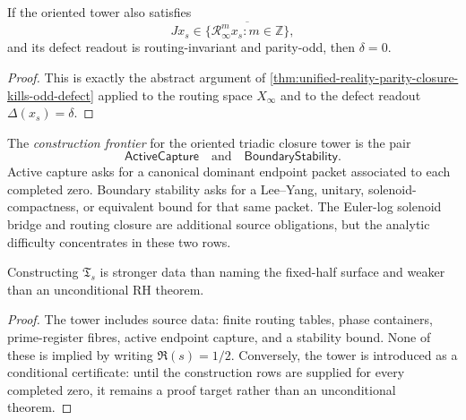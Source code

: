 \begin{corollary}
\label{cor:unified-reality-oriented-tower-parity-closure-same-conclusion}
If the oriented tower also satisfies
$$
Jx_s\in\overline{\{\mathcal R_\infty^m x_s:m\in\mathbb Z\}},
$$
and its defect readout is routing-invariant and parity-odd, then
$\delta=0$.
\end{corollary}

\begin{proof}
This is exactly the abstract argument of
\autoref{thm:unified-reality-parity-closure-kills-odd-defect} applied to
the routing space $X_\infty$ and to the defect readout
$\Delta(x_s)=\delta$.
\end{proof}

\begin{definition}
\label{def:unified-reality-oriented-tower-construction-frontier}
The \emph{construction frontier} for the oriented triadic closure tower
is the pair
$$
\mathsf{ActiveCapture}
\quad\text{and}\quad
\mathsf{BoundaryStability}.
$$
Active capture asks for a canonical dominant endpoint packet associated
to each completed zero.  Boundary stability asks for a Lee--Yang,
unitary, solenoid-compactness, or equivalent bound for that same packet.
The Euler-log solenoid bridge and routing closure are additional source
obligations, but the analytic difficulty concentrates in these two rows.
\end{definition}

\begin{corollary}
\label{cor:unified-reality-oriented-tower-target-not-zero-statement}
Constructing $\mathfrak T_s$ is stronger data than naming the fixed-half
surface and weaker than an unconditional RH theorem.
\end{corollary}

\begin{proof}
The tower includes source data: finite routing tables, phase containers,
prime-register fibres, active endpoint capture, and a stability bound.
None of these is implied by writing $\Re(s)=1/2$.  Conversely, the tower
is introduced as a conditional certificate: until the construction rows
are supplied for every completed zero, it remains a proof target rather
than an unconditional theorem.
\end{proof}
